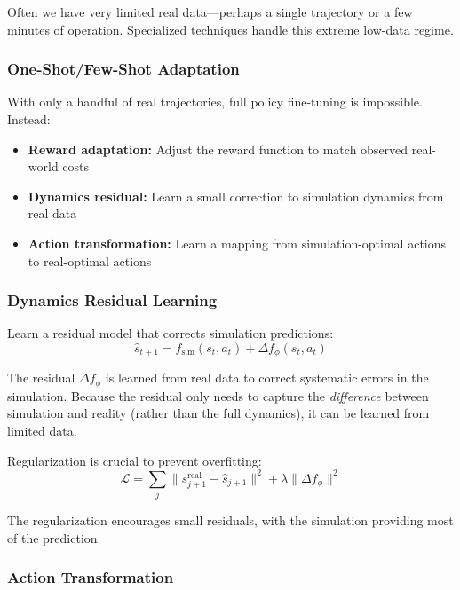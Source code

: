 Often we have very limited real data---perhaps a single trajectory or a few minutes of operation. Specialized techniques handle this extreme low-data regime.

\subsubsection{One-Shot/Few-Shot Adaptation}

With only a handful of real trajectories, full policy fine-tuning is impossible. Instead:
\begin{itemize}
    \item \textbf{Reward adaptation:} Adjust the reward function to match observed real-world costs
    \item \textbf{Dynamics residual:} Learn a small correction to simulation dynamics from real data
    \item \textbf{Action transformation:} Learn a mapping from simulation-optimal actions to real-optimal actions
\end{itemize}

\subsubsection{Dynamics Residual Learning}

Learn a residual model that corrects simulation predictions:
\begin{equation}
\hat{s}_{t+1} = f_{\text{sim}}(s_t, a_t) + \Delta f_\phi(s_t, a_t)
\label{eq:dynamics_residual}
\end{equation}

The residual $\Delta f_\phi$ is learned from real data to correct systematic errors in the simulation. Because the residual only needs to capture the \textit{difference} between simulation and reality (rather than the full dynamics), it can be learned from limited data.

Regularization is crucial to prevent overfitting:
\begin{equation}
\mathcal{L} = \sum_j \| s_{j+1}^{\text{real}} - \hat{s}_{j+1} \|^2 + \lambda \| \Delta f_\phi \|^2
\end{equation}

The regularization encourages small residuals, with the simulation providing most of the prediction.

\subsubsection{Action Transformation}

